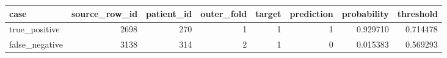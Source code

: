 \begin{tabular}{lrrrrrrr}
\toprule
case & source\_row\_id & patient\_id & outer\_fold & target & prediction & probability & threshold \\
\midrule
true\_positive & 2698 & 270 & 1 & 1 & 1 & 0.929710 & 0.714478 \\
false\_negative & 3138 & 314 & 2 & 1 & 0 & 0.015383 & 0.569293 \\
\bottomrule
\end{tabular}
